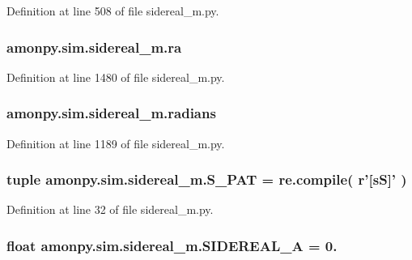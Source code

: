 Definition at line 508 of file sidereal\-\_\-m.\-py.

\hypertarget{namespaceamonpy_1_1sim_1_1sidereal__m_a84b078ad11be9bb8a707b09e4fc9a43d}{
\subsubsection[{ra}]{\setlength{\rightskip}{0pt plus 5cm}amonpy.\-sim.\-sidereal\-\_\-m.\-ra}}\label{namespaceamonpy_1_1sim_1_1sidereal__m_a84b078ad11be9bb8a707b09e4fc9a43d}


Definition at line 1480 of file sidereal\-\_\-m.\-py.

\hypertarget{namespaceamonpy_1_1sim_1_1sidereal__m_a37d5a86d629c9df7aa8116d898e19f50}{
\subsubsection[{radians}]{\setlength{\rightskip}{0pt plus 5cm}amonpy.\-sim.\-sidereal\-\_\-m.\-radians}}\label{namespaceamonpy_1_1sim_1_1sidereal__m_a37d5a86d629c9df7aa8116d898e19f50}


Definition at line 1189 of file sidereal\-\_\-m.\-py.

\hypertarget{namespaceamonpy_1_1sim_1_1sidereal__m_a2fc65a0a9abc9f2f519d6b1754cc027a}{
\subsubsection[{S\-\_\-\-P\-A\-T}]{\setlength{\rightskip}{0pt plus 5cm}tuple amonpy.\-sim.\-sidereal\-\_\-m.\-S\-\_\-\-P\-A\-T = re.\-compile( r'\mbox{[}s\-S\mbox{]}' )}}\label{namespaceamonpy_1_1sim_1_1sidereal__m_a2fc65a0a9abc9f2f519d6b1754cc027a}


Definition at line 32 of file sidereal\-\_\-m.\-py.

\hypertarget{namespaceamonpy_1_1sim_1_1sidereal__m_a883e8197cf5ed1c389f4dbcfd8a9cd0e}{
\subsubsection[{S\-I\-D\-E\-R\-E\-A\-L\-\_\-\-A}]{\setlength{\rightskip}{0pt plus 5cm}float amonpy.\-sim.\-sidereal\-\_\-m.\-S\-I\-D\-E\-R\-E\-A\-L\-\_\-\-A = 0.}}\label{namespaceamonpy_1_1sim_1_1sidereal__m_a883e8197cf5ed1c389f4dbcfd8a9cd0e}


